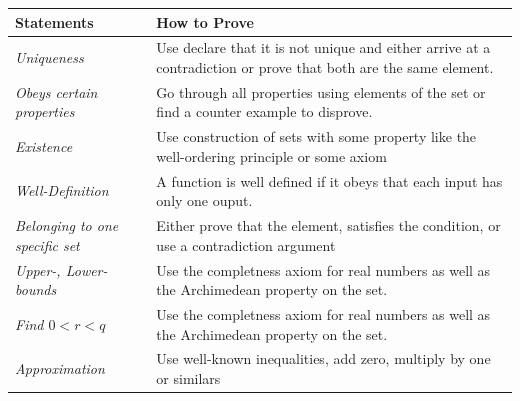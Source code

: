 \begin{center}
	\begin{tabular}{|l|l|}
		\hline
		\textbf{Statements}                  & \textbf{How to Prove}                                                                                           \\
		\hline
		\emph{Uniqueness}                    & Use declare that it is not unique and either arrive at a contradiction or prove that both are the same element. \\
		\hline
		\emph{Obeys certain properties}      & Go through all properties using elements of the set or find a counter example to disprove.                      \\
		\hline
		\emph{Existence}                     & Use construction of sets with some property like the well-ordering principle or some axiom                      \\
		\hline
		\emph{Well-Definition}               & A function is well defined if it obeys that each input has only one ouput.                                      \\
		\hline
		\emph{Belonging to one specific set} & Either prove that the element, satisfies the condition, or use a contradiction argument                         \\
		\hline
		\emph{Upper-, Lower-bounds}          & Use the completness axiom for real numbers as well as the Archimedean property on the set.                      \\
		\hline
		\emph{Find \(0 < r < q\)}            & Use the completness axiom for real numbers as well as the Archimedean property on the set.                      \\
		\hline
		\emph{Approximation}                 & Use well-known inequalities, add zero, multiply by one or similars                                              \\
		\hline
	\end{tabular}
\end{center}
